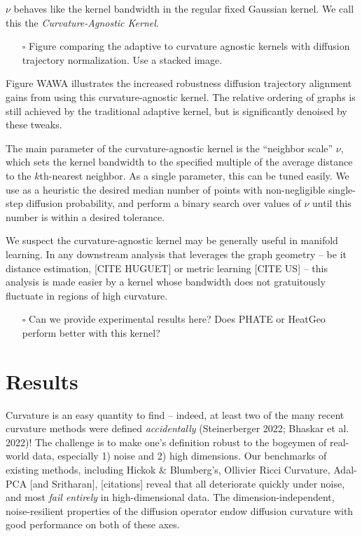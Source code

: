 \documentclass[
  letterpaper,
  DIV=11,
  numbers=noendperiod]{scrartcl}
\providecommand{\tightlist}{%
  \setlength{\itemsep}{0pt}\setlength{\parskip}{0pt}}\usepackage{longtable,booktabs,array}
\theoremstyle{plain}
\theoremstyle{plain}
\theoremstyle{definition}
\theoremstyle{plain}
\theoremstyle{definition}
\theoremstyle{plain}
\theoremstyle{remark}
\begin{document}
\(\nu\) behaves like the kernel bandwidth in the regular fixed Gaussian
kernel. We call this the \emph{Curvature-Agnostic Kernel}.

\begin{itemize}
\tightlist
\item[$\square$]
  Figure comparing the adaptive to curvature agnostic kernels with
  diffusion trajectory normalization. Use a stacked image.
\end{itemize}

Figure WAWA illustrates the increased robustness diffusion trajectory
alignment gains from using this curvature-agnostic kernel. The relative
ordering of graphs is still achieved by the traditional adaptive kernel,
but is significantly denoised by these tweaks.

The main parameter of the curvature-agnostic kernel is the ``neighbor
scale'' \(\nu\), which sets the kernel bandwidth to the specified
multiple of the average distance to the \(k\)th-nearest neighbor. As a
single parameter, this can be tuned easily. We use as a heuristic the
desired median number of points with non-negligible single-step
diffusion probability, and perform a binary search over values of
\(\nu\) until this number is within a desired tolerance.

We suspect the curvature-agnostic kernel may be generally useful in
manifold learning. In any downstream analysis that leverages the graph
geometry -- be it distance estimation, {[}CITE HUGUET{]} or metric
learning {[}CITE US{]} -- this analysis is made easier by a kernel whose
bandwidth does not gratuitously fluctuate in regions of high curvature.

\begin{itemize}
\tightlist
\item[$\square$]
  Can we provide experimental results here? Does PHATE or HeatGeo
  perform better with this kernel?
\end{itemize}

\section{Results}\label{results}

Curvature is an easy quantity to find -- indeed, at least two of the
many recent curvature methods were defined \emph{accidentally}
(Steinerberger 2022; Bhaskar et al. 2022)! The challenge is to make
one's definition robust to the bogeymen of real-world data, especially
1) noise and 2) high dimensions. Our benchmarks of existing methods,
including Hickok \& Blumberg's, Ollivier Ricci Curvature, Adal-PCA
{[}and Sritharan{]}, {[}citations{]} reveal that all deteriorate quickly
under noise, and most \emph{fail entirely} in high-dimensional data. The
dimension-independent, noise-resilient properties of the diffusion
operator endow diffusion curvature with good performance on both of
these axes.
\end{document}
